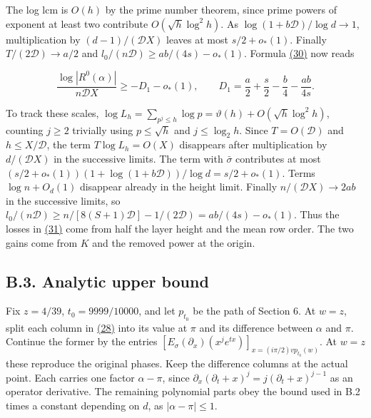 \documentclass[11pt,a4paper]{article}
\begin{document}
The log lcm is \(O(h)\) by the prime number theorem, since prime powers of exponent at least two contribute \(O(\sqrt h\log^2 h)\). As \(\log(1+b\mathscr D)/\log d\to1\), multiplication by \((d-1)/(\mathscr D X)\) leaves at most \(s/2+o_*(1)\). Finally \(T/(2\mathscr D)\to a/2\) and \(l_0/(n\mathscr D)\ge ab/(4s)-o_*(1)\). Formula \hyperref[eq:30]{(30)} now reads

\[
 \frac{\log|R^0(\alpha)|}{n\mathscr D X}\ge -D_1-o_*(1),\qquad
 D_1=\frac a2+\frac s2-\frac b4-\frac{ab}{4s}.                            \tag{31}\label{eq:31}
\]

To track these scales, \(\log L_h=\sum_{p^j\le h}\log p=\vartheta(h)+O(\sqrt h\log^2 h)\), counting \(j\ge2\) trivially using \(p\le\sqrt h\) and \(j\le\log_2h\). Since \(T=O(\mathscr D)\) and \(h\le X/\mathscr D\), the term \(T\log L_h=O(X)\) disappears after multiplication by \(d/(\mathscr D X)\) in the successive limits. The term with \(\bar\sigma\) contributes at most \((s/2+o_*(1))(1+\log(1+b\mathscr D))/\log d=s/2+o_*(1)\). Terms \(\log n+O_d(1)\) disappear already in the height limit. Finally \(n/(\mathscr D X)\to 2ab\) in the successive limits, so \(l_0/(n\mathscr D)\ge n/[8(S+1)\mathscr D]-1/(2\mathscr D)=ab/(4s)-o_*(1)\). Thus the losses in \hyperref[eq:31]{(31)} come from half the layer height and the mean row order. The two gains come from \(K\) and the removed power at the origin.

\subsection{B.3. Analytic upper bound}\label{b.3.-analytic-upper-bound}

Fix \(z=4/39\), \(t_0=9999/10000\), and let \(p_{t_0}\) be the path of Section 6. At \(w=z\), split each column in \hyperref[eq:28]{(28)} into its value at \(\pi\) and its difference between \(\alpha\) and \(\pi\). Continue the former by the entries \([E_\sigma(\partial_x)(x^j e^{tx})]_{x=(i\pi/2)v p_{t_0}(w)}\). At \(w=z\) these reproduce the original phases. Keep the difference columns at the actual point. Each carries one factor \(\alpha-\pi\), since \(\partial_x(\partial_t+x)^j=j(\partial_t+x)^{j-1}\) as an operator derivative. The remaining polynomial parts obey the bound used in B.2 times a constant depending on \(d\), as \(|\alpha-\pi|\le1\).
\end{document}

